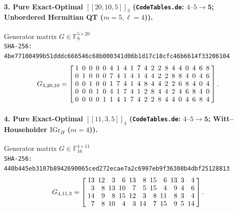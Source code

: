 \documentclass[11pt,a4paper]{article}
\theoremstyle{remark}
\begin{document}
\paragraph{3. Pure Exact-Optimal $[[20,10,5]]_{3}$ (\texttt{CodeTables.de}: $4\text{--}5 \to \mathbf{5}$; Unbordered Hermitian QT ($m=5, \ell=4$)).} Generator matrix $G \in \mathbb{F}_{9}^{5 \times 20}$\\
{\footnotesize\texttt{SHA-256: 4be77100499b51dddc666546c68b000341d06b1d17c18cfc46b6614f33206104}}
{\scriptsize\[
G_{3,20,10} = \setlength{\arraycolsep}{2.5pt}\renewcommand{\arraystretch}{0.95}
\left[\begin{array}{*{20}{r}}
1 & 0 & 0 & 0 & 0 & 4 & 1 & 4 & 1 & 7 & 4 & 2 & 2 & 8 & 4 & 4 & 0 & 4 & 6 & 8 \\
0 & 1 & 0 & 0 & 0 & 7 & 4 & 1 & 4 & 1 & 4 & 4 & 2 & 2 & 8 & 8 & 4 & 0 & 4 & 6 \\
0 & 0 & 1 & 0 & 0 & 1 & 7 & 4 & 1 & 4 & 8 & 4 & 4 & 2 & 2 & 6 & 8 & 4 & 0 & 4 \\
0 & 0 & 0 & 1 & 0 & 4 & 1 & 7 & 4 & 1 & 2 & 8 & 4 & 4 & 2 & 4 & 6 & 8 & 4 & 0 \\
0 & 0 & 0 & 0 & 1 & 1 & 4 & 1 & 7 & 4 & 2 & 2 & 8 & 4 & 4 & 0 & 4 & 6 & 8 & 4
\end{array}\right].
\]}

\paragraph{4. Pure Exact-Optimal $[[11,3,5]]_{4}$ (\texttt{CodeTables.de}: $4\text{--}5 \to \mathbf{5}$; Witt--Householder $\mathrm{IGr}_H$ ($m=4$)).} Generator matrix $G \in \mathbb{F}_{16}^{4 \times 11}$\\
{\footnotesize\texttt{SHA-256: 440b445eb3107b8942690065ced272ecae7a2c6997eb9f36308b4dbf25128813}}
{\scriptsize\[
G_{4,11,3} = \setlength{\arraycolsep}{2.5pt}\renewcommand{\arraystretch}{0.95}
\left[\begin{array}{*{11}{r}}
13 & 12 & 3 & 6 & 13 & 8 & 15 & 6 & 13 & 3 & 4 \\
3 & 8 & 13 & 10 & 7 & 5 & 15 & 4 & 9 & 4 & 6 \\
14 & 9 & 8 & 15 & 12 & 3 & 8 & 11 & 8 & 3 & 4 \\
7 & 8 & 10 & 4 & 3 & 14 & 7 & 15 & 9 & 5 & 14
\end{array}\right].
\]}
\end{document}
